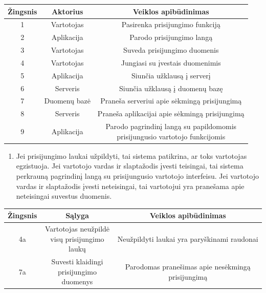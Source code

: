 \documentclass[12pt]{article}
\begin{document}
		\begin{center}
		\begin{tabular}{ | c | c | c | }
			\hline
			Žingsnis & Aktorius     & Veiklos apibūdinimas \\ \hline
			1        & Vartotojas   & Pasirenka prisijungimo funkciją \\ \hline
			2        & Aplikacija   & Parodo prisijungimo langą \\ \hline
			3        & Vartotojas   & Suveda prisijungimo duomenis \\ \hline
			4        & Vartotojas   & Jungiasi su įvestais duomenimis \\ \hline
			5        & Aplikacija   & Siunčia užklausą į serverį \\ \hline
			6        & Serveris     & Siunčia užklausą į duomenų bazę \\ \hline
			7        & Duomenų bazė & Praneša serveriui apie sėkmingą prisijungimą \\ \hline
			8        & Serveris     & Praneša aplikacijai apie sėkmingą prisijungimą \\ \hline
			9        & Aplikacija   & \makecell{Parodo pagrindinį langą su papildomomis \\ prisijungusio vartotojo funkcijomis} \\ \hline
		\end{tabular}
		\bigskip
		\end{center}
		
	\begin{enumerate}[resume, labelindent=10pt,leftmargin=2.2cm]
		\item Jei prisijungimo laukai užpildyti, tai sistema patikrina, ar toks vartotojas egzistuoja. Jei vartotojo vardas ir slaptažodis įvesti teisingai, tai sistema perkrauną pagrindinį langą su prisijungusio vartotojo interfeisu. Jei vartotojo vardas ir slaptažodis įvesti neteisingai, tai vartotojui yra pranešama apie neteisingai suvestus duomenis.
	\end{enumerate}		
		
		\begin{center}
		\begin{tabular}{ | c | c | c | }
			\hline
			Žingsnis & Sąlyga                                     & Veiklos apibūdinimas \\ \hline
			4a       & \makecell{Vartotojas neužpildė \\ visų prisijungimo laukų} & Neužpildyti laukai yra paryškinami raudonai \\ \hline
			7a       & \makecell{Suvesti klaidingi \\ prisijungimo duomenys} & Parodomas pranešimas apie nesėkmingą prisijungimą \\ \hline
		\end{tabular}
		\end{center}
	\pagebreak
	
\end{document}
